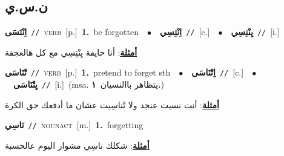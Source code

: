 \documentclass[10pt,a4paper,twoside]{article} %
\begin{document}
\begin{multicols}{2}
\vspace{-3mm}
\subsection*{\color{blue}\foreignlanguage{arabic}{ن.س.ي}\color{blue}{}} 

{\setlength\topsep{0pt}\textbf{\foreignlanguage{arabic}{اِنْتَسَى}}\ {\color{gray}\texttt{//}\color{black}}\ \textsc{verb}\ [p.]\ \textbf{1.}~be forgotten\ \ $\bullet$\ \ \setlength\topsep{0pt}\textbf{\foreignlanguage{arabic}{اِنْتِسِي}}\ {\color{gray}\texttt{//}\color{black}}\ [c.]\ \ $\bullet$\ \ \setlength\topsep{0pt}\textbf{\foreignlanguage{arabic}{يِنْتِسِي}}\ {\color{gray}\texttt{//}\color{black}}\ [i.]\  \begin{flushright}\color{gray}\foreignlanguage{arabic}{\textbf{\underline{\foreignlanguage{arabic}{أمثلة}}}: أنا خايفة يِنْتِسِي مع كل هالعجقة}\end{flushright}\color{black}} \vspace{2mm}

{\setlength\topsep{0pt}\textbf{\foreignlanguage{arabic}{تْنَاسَى}}\ {\color{gray}\texttt{//}\color{black}}\ \textsc{verb}\ [p.]\ \textbf{1.}~pretend to forget sth\ \ $\bullet$\ \ \setlength\topsep{0pt}\textbf{\foreignlanguage{arabic}{اِتْنَاسَى}}\ {\color{gray}\texttt{//}\color{black}}\ [c.]\ \ $\bullet$\ \ \setlength\topsep{0pt}\textbf{\foreignlanguage{arabic}{يِتْنَاسَى}}\ {\color{gray}\texttt{//}\color{black}}\ [i.]\ \color{gray}(msa. \foreignlanguage{arabic}{يتظاهر باالنسيان}~\foreignlanguage{arabic}{\textbf{١.}})\color{black}\  \begin{flushright}\color{gray}\foreignlanguage{arabic}{\textbf{\underline{\foreignlanguage{arabic}{أمثلة}}}: أنت نسيت عنجد ولا تْناسِيت عشان ما أدفعك حق الكرة}\end{flushright}\color{black}} \vspace{2mm}

{\setlength\topsep{0pt}\textbf{\foreignlanguage{arabic}{نَاسِي}}\ {\color{gray}\texttt{//}\color{black}}\ \textsc{noun\textunderscore act}\ [m.]\ \textbf{1.}~forgetting\  \begin{flushright}\color{gray}\foreignlanguage{arabic}{\textbf{\underline{\foreignlanguage{arabic}{أمثلة}}}: شكلك ناسِي مشوار اليوم عالحسبة}\end{flushright}\color{black}} \vspace{2mm}


\end{multicols}
\end{document}
